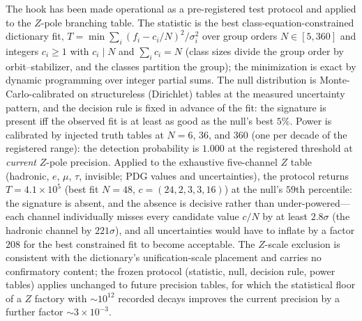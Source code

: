 The hook has been made operational as a pre-registered test protocol and applied to the
$Z$-pole branching table. The statistic is the best class-equation-constrained dictionary
fit,
$T=\min\sum_{i}(f_{i}-c_{i}/N)^{2}/\sigma_{i}^{2}$ over group orders $N\in[5,360]$ and
integers $c_{i}\geq1$ with $c_{i}\mid N$ and $\sum_{i}c_{i}=N$ (class sizes divide the
group order by orbit--stabilizer, and the classes partition the group); the minimization is
exact by dynamic programming over integer partial sums. The null distribution is
Monte-Carlo-calibrated on structureless (Dirichlet) tables at the measured uncertainty
pattern, and the decision rule is fixed in advance of the fit: the signature is present iff
the observed fit is at least as good as the null's best $5\%$. Power is calibrated by
injected truth tables at $N=6$, $36$, and $360$ (one per decade of the registered range):
the detection probability is $1.000$ at the registered threshold at \emph{current}
$Z$-pole precision. Applied to the exhaustive five-channel $Z$ table
(hadronic, $e$, $\mu$, $\tau$, invisible; PDG values and uncertainties), the protocol
returns $T=4.1\times10^{5}$ (best fit $N=48$, $c=(24,2,3,3,16)$) at the null's $59$th
percentile: the signature is absent, and the absence is decisive rather than
under-powered---each channel individually misses every candidate value $c/N$ by at least
$2.8\sigma$ (the hadronic channel by $221\sigma$), and all uncertainties would have to
inflate by a factor $208$ for the best constrained fit to become acceptable. The $Z$-scale
exclusion is consistent with the dictionary's unification-scale placement and carries no
confirmatory content; the frozen protocol (statistic, null, decision rule, power tables)
applies unchanged to future precision tables, for which the statistical floor of a
$Z$ factory with $\sim10^{12}$ recorded decays improves the current precision by a further
factor $\sim3\times10^{-3}$.
